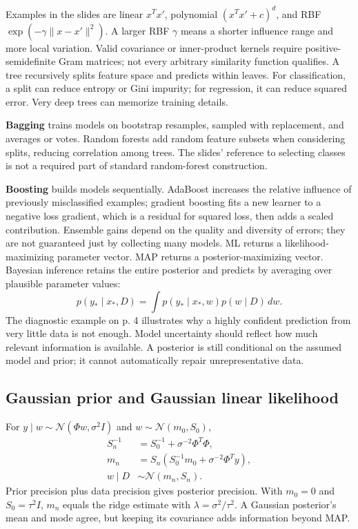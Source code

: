 \documentclass[11pt]{article}
\begin{document}
Examples in the slides are linear $x^Tx'$, polynomial $(x^Tx'+c)^d$, and RBF $\exp(-\gamma\|x-x'\|^2)$. A larger RBF $\gamma$ means a shorter influence range and more local variation. Valid covariance or inner-product kernels require positive-semidefinite Gram matrices; not every arbitrary similarity function qualifies.
A tree recursively splits feature space and predicts within leaves. For classification, a split can reduce entropy or Gini impurity; for regression, it can reduce squared error. Very deep trees can memorize training details.

\textbf{Bagging} trains models on bootstrap resamples, sampled with replacement, and averages or votes. Random forests add random feature subsets when considering splits, reducing correlation among trees. The slides' reference to selecting classes is not a required part of standard random-forest construction.

\textbf{Boosting} builds models sequentially. AdaBoost increases the relative influence of previously misclassified examples; gradient boosting fits a new learner to a negative loss gradient, which is a residual for squared loss, then adds a scaled contribution. Ensemble gains depend on the quality and diversity of errors; they are not guaranteed just by collecting many models.
ML returns a likelihood-maximizing parameter vector. MAP returns a posterior-maximizing vector. Bayesian inference retains the entire posterior and predicts by averaging over plausible parameter values:
\[
p(y_*\mid x_*,D)=\int p(y_*\mid x_*,w)p(w\mid D)\,dw.
\]
The diagnostic example on p. 4 illustrates why a highly confident prediction from very little data is not enough. Model uncertainty should reflect how much relevant information is available. A posterior is still conditional on the assumed model and prior; it cannot automatically repair unrepresentative data.
\subsection{Gaussian prior and Gaussian linear likelihood}
For $y\mid w\sim\mathcal N(\Phi w,\sigma^2I)$ and $w\sim\mathcal N(m_0,S_0)$,
\begin{align*}
S_n^{-1}&=S_0^{-1}+\sigma^{-2}\Phi^T\Phi,\\
m_n&=S_n(S_0^{-1}m_0+\sigma^{-2}\Phi^Ty),\\
w\mid D&\sim\mathcal N(m_n,S_n).
\end{align*}
Prior precision plus data precision gives posterior precision. With $m_0=0$ and $S_0=\tau^2I$, $m_n$ equals the ridge estimate with $\lambda=\sigma^2/\tau^2$. A Gaussian posterior's mean and mode agree, but keeping its covariance adds information beyond MAP.
\end{document}
